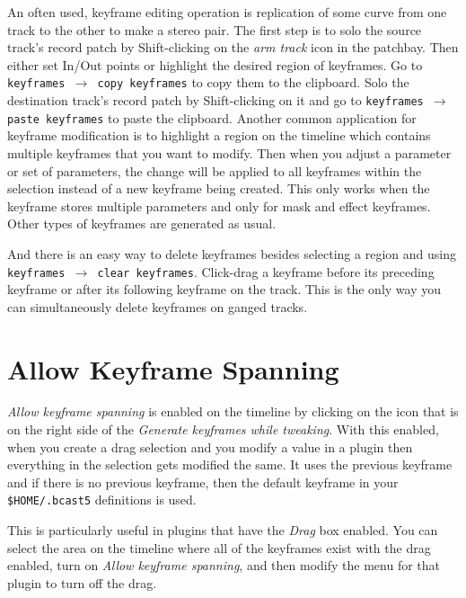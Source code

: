 An often used, keyframe editing operation is replication of some curve from one track to the other to make a stereo pair.  The first step is to solo the source track's record patch by Shift-clicking on the \textit{arm track} icon in the patchbay.  Then either set In/Out points or highlight the desired region of keyframes.  Go to \texttt{keyframes $\rightarrow$ copy keyframes} to copy them to the clipboard.  Solo the destination track's record patch by Shift-clicking on it and go to \texttt{keyframes $\rightarrow$ paste keyframes} to paste the clipboard.  Another common application for keyframe modification is to highlight a region on the timeline which contains multiple keyframes that you want to modify.  Then when you adjust a parameter or set of parameters, the change will be applied to all keyframes within the selection instead of a new keyframe being created.  This only works when the keyframe stores multiple parameters and only for mask and effect keyframes.  Other types of keyframes are generated as usual.

And there is an easy way to delete keyframes besides selecting a region and using \texttt{keyframes $\rightarrow$ clear keyframes}. Click-drag a keyframe before its preceding keyframe or after its following keyframe on the track.  This is the only way you can simultaneously delete keyframes on ganged tracks.

\section{Allow Keyframe Spanning}%
\label{sec:allow_keyframes_spanning}

\textit{Allow keyframe spanning} is enabled on the timeline by clicking on the icon that
is on the right side of the \textit{Generate keyframes while tweaking}.  With this enabled,
when you create a drag selection and you modify a value in a plugin then everything in
the selection gets modified the same.  It uses the previous keyframe and if there is no
previous keyframe, then the default keyframe in your \texttt{\$HOME/.bcast5} definitions
is used.

This is particularly useful in plugins that have the \textit{Drag} box enabled.  You can
select the area on the timeline where all of the keyframes exist with the drag enabled,
turn on \textit{Allow keyframe spanning}, and then modify the menu for that plugin to turn
off the drag.


